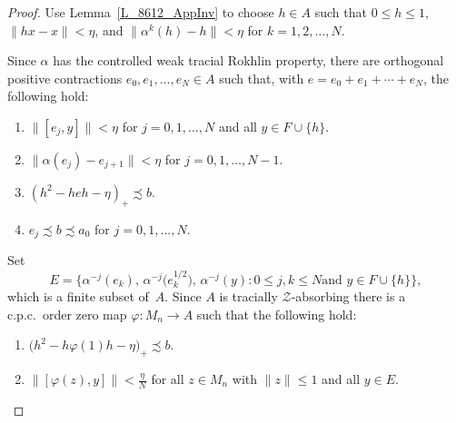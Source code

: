 \documentclass[11pt]{amsart}
\theoremstyle{plain}
\theoremstyle{definition}
\theoremstyle{remark}
\numberwithin{equation}{section}
\newcounter{TmpEnumi}
\begin{document}
\begin{proof}
Use Lemma~\ref{L_8612_AppInv}
to choose $h \in A$
such that $0 \leq h \leq 1$,
$\| h x - x \| < \eta$,
and $\| \alpha^k (h) - h \| < \eta$
for $k = 1, 2, \ldots, N$.

Since $\alpha$ has the controlled weak tracial Rokhlin property,
there are orthogonal positive contractions
$e_{0}, e_{1}, \ldots, e_{N} \in A$ such that,
with $e = e_{0} + e_{1} + \cdots + e_{N}$, the following hold:
%
\begin{enumerate}
\setcounter{enumi}{\value{TmpEnumi}}
\item\label{lem7_9item5}
$\| [e_{j}, y] \| < \eta$ for $j = 0, 1, \ldots, N$
and all $y \in F \cup \{h\}$.
\item\label{lem7_9item6}
$\|\alpha (e_{j}) - e_{j + 1} \| < \eta$ for $j = 0, 1, \ldots, N - 1$.
\item\label{lem7_9item7}
$(h^{2} - h e h - \eta)_{+} \precsim b$.
\item\label{defwtrpaut_it18}
$e_{j} \precsim b \precsim a_{0}$ for $j = 0, 1, \ldots, N$.
\setcounter{TmpEnumi}{\value{enumi}}
\end{enumerate}
Set
%
\[
E = \big\{ \alpha^{- j} (e_{k}),
 \, \alpha^{- j} \big( e_{k}^{1/2} \big), \, \alpha^{- j} (y)
\colon
 {\mbox{$0 \leq j, k \leq N$
        and $y \in F \cup \{h\}$}} \big\},
\]
%
which is a finite subset of~$A$.
Since $A$ is tracially $\mathcal{Z}$-absorbing there is
a c.p.c.~order zero map $\varphi \colon M_{n} \to A$
such that the following hold:
%
\begin{enumerate}
\setcounter{enumi}{\value{TmpEnumi}}
\item\label{lem7_9item8}
$\big( h^{2} - h \varphi (1) h - \eta \big)_{+} \precsim b$.
\item\label{lem7_9item9}
$\| [\varphi (z), y] \| < \tfrac{\eta}{N}$
for all $z \in M_{n}$ with $\|z\| \leq 1$
and all $y \in E$.
\setcounter{TmpEnumi}{\value{enumi}}
\end{enumerate}
%


\end{proof}
\end{document}
